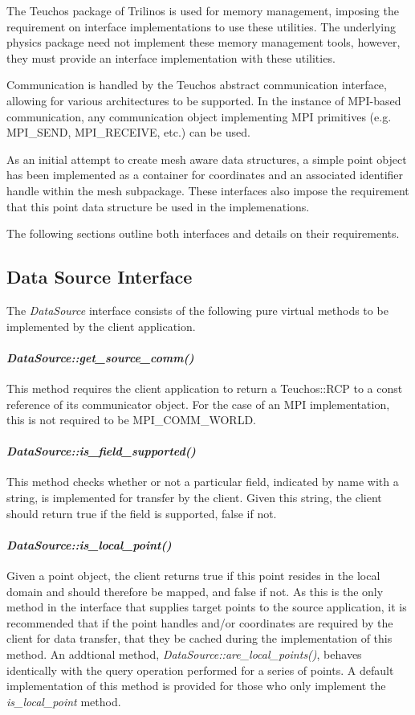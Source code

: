 \documentclass[letterpaper]{article}
\begin{document}
The Teuchos package of Trilinos is used for memory management,
imposing the requirement on interface implementations to use these
utilities. The underlying physics package need not implement these
memory management tools, however, they must provide an interface
implementation with these utilities.

Communication is handled by the Teuchos abstract communication
interface, allowing for various architectures to be supported. In the
instance of MPI-based communication, any communication object
implementing MPI primitives (e.g. MPI\_SEND, MPI\_RECEIVE, etc.) can
be used. 

As an initial attempt to create mesh aware data structures, a simple
point object has been implemented as a container for coordinates and
an associated identifier handle within the mesh subpackage. These
interfaces also impose the requirement that this point data structure
be used in the implemenations.

The following sections outline both interfaces and details on their
requirements. 

\subsection{Data Source Interface}
The {\sl DataSource} interface consists of the following pure
virtual methods to be implemented by the client application.

\paragraph{\sl DataSource::get\_source\_comm()}
This method requires the client application to return a Teuchos::RCP
to a const reference of its communicator object. For the case of an
MPI implementation, this is not required to be MPI\_COMM\_WORLD.

\paragraph{\sl DataSource::is\_field\_supported()}
This method checks whether or not a particular field, indicated by
name with a string, is implemented for transfer by the client. Given
this string, the client should return true if the field is supported,
false if not.

\paragraph{\sl DataSource::is\_local\_point()}
Given a point object, the client returns true if this point resides in
the local domain and should therefore be mapped, and false if not. As
this is the only method in the interface that supplies target points
to the source application, it is recommended that if the point handles
and/or coordinates are required by the client for data transfer, that
they be cached during the implementation of this method. An addtional
method, {\sl DataSource::are\_local\_points()}, behaves identically
with the query operation performed for a series of points. A default
implementation of this method is provided for those who only implement
the {\sl is\_local\_point} method.
\end{document}
